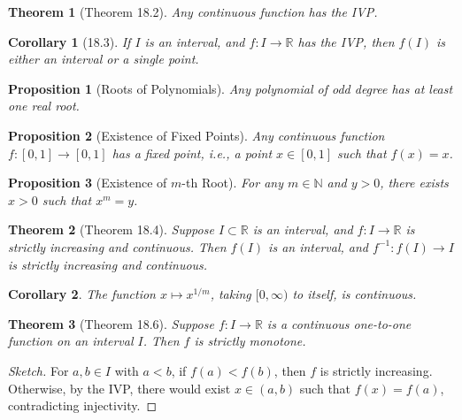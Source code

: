 \documentclass[7pt]{article}
\theoremstyle{definition}
\theoremstyle{plain}
\newtheorem{theorem}{Theorem}
\newtheorem{proposition}{Proposition}
\newtheorem{corollary}{Corollary}
\begin{document}
\begin{theorem}[Theorem 18.2]
Any continuous function has the IVP.
\end{theorem}

\begin{corollary}[18.3]
If $ I $ is an interval, and $ f : I \to \mathbb{R} $ has the IVP, then $ f(I) $ is either an interval or a single point.
\end{corollary}

\begin{proposition}[Roots of Polynomials]
Any polynomial of odd degree has at least one real root.
\end{proposition}

\begin{proposition}[Existence of Fixed Points]
Any continuous function $ f : [0, 1] \to [0, 1] $ has a fixed point, i.e., a point $ x \in [0, 1] $ such that $ f(x) = x $.
\end{proposition}

\begin{proposition}[Existence of $ m $-th Root]
For any $ m \in \mathbb{N} $ and $ y > 0 $, there exists $ x > 0 $ such that $ x^m = y $.
\end{proposition}

\begin{theorem}[Theorem 18.4]
Suppose $ I \subset \mathbb{R} $ is an interval, and $ f : I \to \mathbb{R} $ is strictly increasing and continuous. Then $ f(I) $ is an interval, and $ f^{-1} : f(I) \to I $ is strictly increasing and continuous.
\end{theorem}

\begin{corollary}
The function $ x \mapsto x^{1/m} $, taking $ [0, \infty) $ to itself, is continuous.
\end{corollary}

\begin{theorem}[Theorem 18.6]
Suppose $ f : I \to \mathbb{R} $ is a continuous one-to-one function on an interval $ I $. Then $ f $ is strictly monotone.
\end{theorem}

\begin{proof}[Sketch]
For $ a, b \in I $ with $ a < b $, if $ f(a) < f(b) $, then $ f $ is strictly increasing. Otherwise, by the IVP, there would exist $ x \in (a, b) $ such that $ f(x) = f(a) $, contradicting injectivity.
\end{proof}
\end{document}
